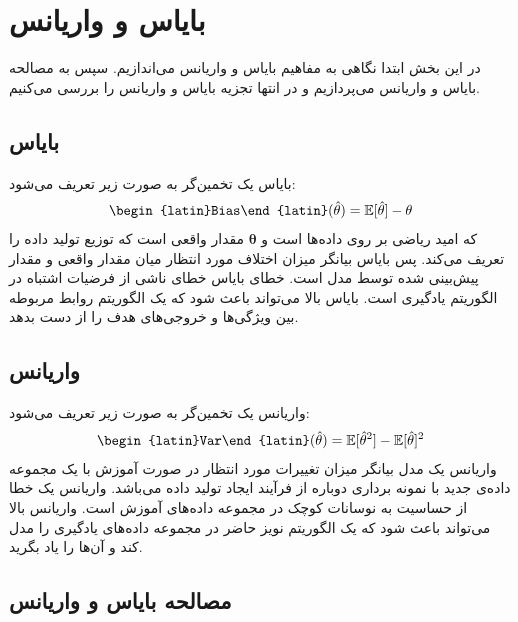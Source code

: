 \section{بایاس و واریانس}

در این بخش ابتدا نگاهی به مفاهیم بایاس و واریانس می‌اندازیم. سپس به مصالحه بایاس و واریانس می‌پردازیم و در انتها تجزیه بایاس و واریانس را بررسی می‌کنیم.

\subsection{بایاس}

بایاس یک تخمین‌گر به صورت زیر تعریف می‌شود:
\begin{align*}
    \text{\begin{latin}Bias\end{latin}}(\hat{\mathbf{\theta}}) = \mathbb{E}[\hat{\mathbf{\theta}}] - \mathbf{\theta}
\end{align*}
که امید ریاضی بر روی داده‌ها است و $\mathbf{\theta}$ مقدار واقعی است که توزیع تولید داده را تعریف می‌کند. پس بایاس بیانگر میزان اختلاف مورد انتظار میان مقدار واقعی و مقدار پیش‌بینی شده توسط مدل است. 
خطای بایاس خطای ناشی از فرضیات اشتباه در الگوریتم یادگیری است. بایاس بالا می‌تواند باعث شود که یک الگوریتم روابط مربوطه بین ویژگی‌ها و خروجی‌های هدف را از دست بدهد.

\subsection{واریانس}

واریانس یک تخمین‌گر به صورت زیر تعریف می‌شود:
\begin{align*}
    \text{\begin{latin}Var\end{latin}}(\hat{\mathbf{\theta}}) = \mathbb{E}[\hat{\mathbf{\theta}}^2] -  \mathbb{E}[\hat{\mathbf{\theta}}]^2
\end{align*}
واریانس یک مدل بیانگر میزان تغییرات مورد انتظار در صورت آموزش با یک مجموعه داده‌ی جدید با نمونه برداری دوباره از فرآیند ایجاد تولید داده می‌باشد. 
واریانس یک خطا از حساسیت به نوسانات کوچک در مجموعه داده‌های آموزش است. واریانس بالا می‌تواند باعث شود که یک الگوریتم نویز حاضر در مجموعه داده‌های یادگیری را مدل کند و آن‌ها را یاد بگرید.

\subsection{مصالحه بایاس و واریانس}


